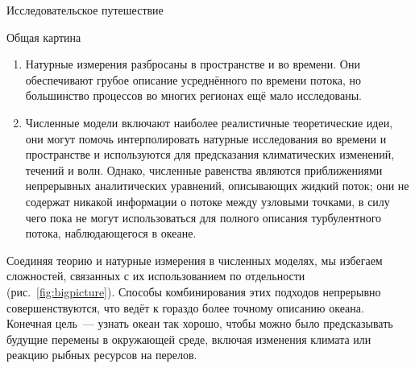 \begin{chapter}{Исследовательское путешествие}
\begin{section}{Общая картина}
\begin{enumerate}
\item
Натурные измерения разбросаны в пространстве и во времени. Они обеспечивают 
грубое описание усреднённого по времени потока, но большинство процессов 
во многих регионах ещё мало исследованы.
%

\item
Численные модели включают наиболее реалистичные теоретические идеи, они могут 
помочь интерполировать натурные исследования во времени и пространстве 
и используются для предсказания климатических изменений, течений и волн. 
Однако, численные равенства являются приближениями непрерывных аналитических 
уравнений, описывающих жидкий поток; они не содержат никакой информации о 
потоке между узловыми точками, в силу чего пока не могут использоваться 
для полного описания турбулентного потока, наблюдающегося в океане. 
%
\end{enumerate}

Соединяя теорию и натурные измерения в численных моделях, мы избегаем 
сложностей, связанных с их использованием по отдельности 
(рис.~\ref{fig:bigpicture}). Способы комбинирования
этих подходов непрерывно совершенствуются, что ведёт к гораздо 
более точному описанию океана. Конечная цель~--- узнать океан так хорошо, 
чтобы можно было предсказывать будущие перемены в окружающей среде, 
включая изменения климата или реакцию рыбных ресурсов на перелов.
%


\end{section}
\end{chapter}
